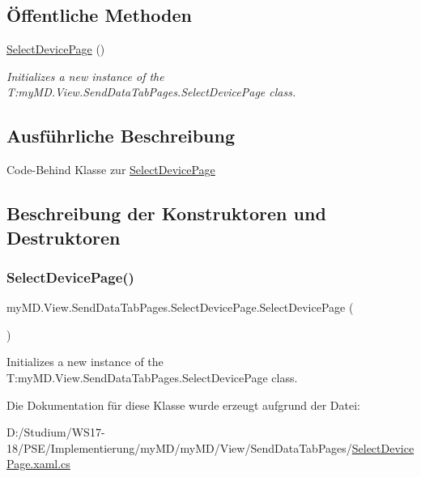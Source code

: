 \subsection*{Öffentliche Methoden}
\begin{DoxyCompactItemize}
\item 
\mbox{\hyperlink{classmy_m_d_1_1_view_1_1_send_data_tab_pages_1_1_select_device_page_a64f3adab09e13f5a8739a275f64215f9}{Select\+Device\+Page}} ()
\begin{DoxyCompactList}\small\item\em Initializes a new instance of the T\+:my\+M\+D.\+View.\+Send\+Data\+Tab\+Pages.\+Select\+Device\+Page class. \end{DoxyCompactList}\end{DoxyCompactItemize}


\subsection{Ausführliche Beschreibung}
Code-\/\+Behind Klasse zur \mbox{\hyperlink{classmy_m_d_1_1_view_1_1_send_data_tab_pages_1_1_select_device_page}{Select\+Device\+Page}} 



\subsection{Beschreibung der Konstruktoren und Destruktoren}
\mbox{\label{classmy_m_d_1_1_view_1_1_send_data_tab_pages_1_1_select_device_page_a64f3adab09e13f5a8739a275f64215f9}} 
\subsubsection{\texorpdfstring{Select\+Device\+Page()}{SelectDevicePage()}}
{\footnotesize\ttfamily my\+M\+D.\+View.\+Send\+Data\+Tab\+Pages.\+Select\+Device\+Page.\+Select\+Device\+Page (\begin{DoxyParamCaption}{ }\end{DoxyParamCaption})}



Initializes a new instance of the T\+:my\+M\+D.\+View.\+Send\+Data\+Tab\+Pages.\+Select\+Device\+Page class. 



Die Dokumentation für diese Klasse wurde erzeugt aufgrund der Datei\+:\begin{DoxyCompactItemize}
\item 
D\+:/\+Studium/\+W\+S17-\/18/\+P\+S\+E/\+Implementierung/my\+M\+D/my\+M\+D/\+View/\+Send\+Data\+Tab\+Pages/\mbox{\hyperlink{_select_device_page_8xaml_8cs}{Select\+Device\+Page.\+xaml.\+cs}}\end{DoxyCompactItemize}
